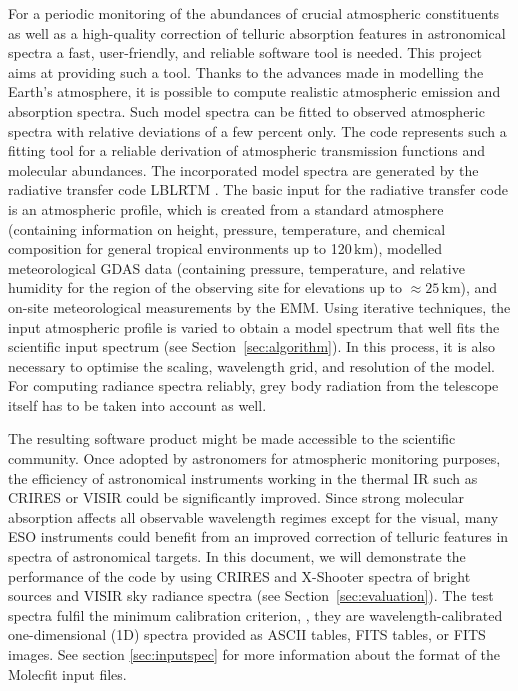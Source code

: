 For a periodic monitoring of the abundances of crucial atmospheric constituents
as well as a high-quality correction of telluric absorption features in
astronomical spectra a fast, user-friendly, and reliable software tool is
needed. This project aims at providing such a tool. Thanks to the advances made
in modelling the Earth's atmosphere, it is possible to compute realistic
atmospheric emission and absorption spectra. Such model spectra can be fitted
to observed atmospheric spectra with relative deviations of a few percent only.
The code \mf{} represents such a fitting tool for a reliable
derivation of atmospheric transmission functions and molecular abundances. The
incorporated model spectra are generated by the radiative transfer code
\ac{LBLRTM} \cite{LBLRTM}. The basic input for the radiative transfer code is
an atmospheric profile, which is created from a standard atmosphere (containing
information on height, pressure, temperature, and chemical composition for
general tropical environments up to 120\,km), modelled meteorological \ac{GDAS}
data (containing pressure, temperature, and relative humidity for the region of
the observing site for elevations up to $\approx 25$\,km), and on-site
meteorological measurements by the \ac{EMM}. Using iterative techniques, the
input atmospheric profile is varied to obtain a model spectrum that well fits
the scientific input spectrum (see Section~\ref{sec:algorithm}). In this
process, it is also necessary to optimise the scaling, wavelength grid, and
resolution of the model. For computing radiance spectra reliably, grey body
radiation from the telescope itself has to be taken into account as well.

The resulting software product might be made accessible to the scientific
community. Once adopted by astronomers for atmospheric monitoring purposes, the
efficiency of astronomical instruments working in the thermal IR such as
CRIRES or VISIR could be significantly improved. Since strong molecular
absorption affects all observable wavelength regimes except for the visual,
many ESO instruments could benefit from an improved correction of telluric
features in spectra of astronomical targets. In this document, we will
demonstrate the performance of the code by using CRIRES and X-Shooter spectra
of bright sources and VISIR sky radiance spectra (see
Section~\ref{sec:evaluation}). The test spectra fulfil the minimum calibration
criterion, \ie, they are wavelength-calibrated one-dimensional (1D) spectra
provided as ASCII tables, FITS tables, or FITS images. See section
\ref{sec:inputspec} for more information about the format of the Molecfit input
files.


